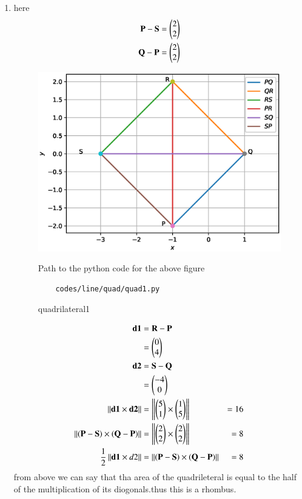 \renewcommand{\theequation}{\theenumi}
\begin{enumerate}[label=\arabic*.,ref=\thesubsection.\theenumi]

\item here
\begin{align}
\mathbf {P} - \mathbf {S} &=  \begin{pmatrix}2\\2\end{pmatrix}
\\
\mathbf {Q} - \mathbf {P} &= \begin{pmatrix}2\\2\end{pmatrix}
\end{align}
\begin{figure}[!ht]
	\centering
	\includegraphics[width=\columnwidth]{./figures/line/quads/quad1.eps}
	\caption{quadrilateral1 }
	\label{fig:quadrilateral1}
	Path to the python code for the above figure
	\begin{lstlisting}
	codes/line/quad/quad1.py
	\end{lstlisting}
\end{figure}
\begin{align}
\mathbf{d1} &= \mathbf{R} - \mathbf{P} 
\\&= \begin{pmatrix}0\\4\end{pmatrix}
\\
\mathbf{d2} &= \mathbf{S} - \mathbf{Q} 
\\&= \begin{pmatrix}-4\\0\end{pmatrix}
\\
\left\lVert \mathbf{\mathbf{d1}} \times \mathbf{\mathbf{d2}}\right\rVert &= 
\left\lVert \mathbf{\begin{pmatrix}5\\1\end{pmatrix}} \times \mathbf{\begin{pmatrix}1\\5\end{pmatrix}}\right\rVert &= 16
\\
\left\lVert \mathbf{\left(\mathbf {P} - \mathbf {S}\right)} \times \mathbf{\left(\mathbf {Q} - \mathbf {P}\right)}\right\rVert &= \left\lVert \mathbf{\begin{pmatrix}2\\2\end{pmatrix}} \times \mathbf{\begin{pmatrix}2\\2\end{pmatrix}}\right\rVert &= 8
\\
\frac{1}{2}\left\lVert \mathbf{\mathbf{d1}} \times \mathbf {\mathbf}{d2}\right\rVert &= \left\lVert \mathbf{\left(\mathbf {P} - \mathbf {S}\right)} \times \mathbf{\left(\mathbf {Q} - \mathbf {P}\right)}\right\rVert&= 8
\end{align}
from above we can say that tha area of the quadrileteral is equal to the half of the multiplication of its diogonals.thus this is a rhombus.





\end{enumerate}
